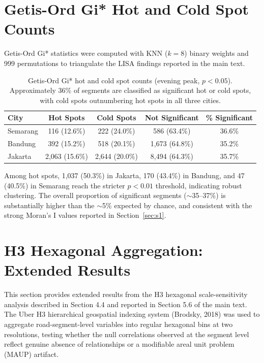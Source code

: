 \documentclass[preprint,12pt]{elsarticle}
\begin{document}
\section{Getis-Ord Gi* Hot and Cold Spot Counts}
\label{sec:s3}

Getis-Ord Gi* statistics were computed with KNN ($k{=}8$) binary weights and 999 permutations to triangulate the LISA findings reported in the main text.

\begin{table}[!htbp]
\centering
\caption{Getis-Ord Gi* hot and cold spot counts (evening peak, $p < 0.05$). Approximately 36\% of segments are classified as significant hot or cold spots, with cold spots outnumbering hot spots in all three cities.}
\label{tab:s3}
\begin{tabular}{lcccc}
\toprule
City & Hot Spots & Cold Spots & Not Significant & \% Significant \\
\midrule
Semarang & 116 (12.6\%) & 222 (24.0\%) & 586 (63.4\%)   & 36.6\% \\
Bandung  & 392 (15.2\%) & 518 (20.1\%) & 1,673 (64.8\%) & 35.2\% \\
Jakarta  & 2,063 (15.6\%) & 2,644 (20.0\%) & 8,494 (64.3\%) & 35.7\% \\
\bottomrule
\end{tabular}
\end{table}

Among hot spots, 1,037 (50.3\%) in Jakarta, 170 (43.4\%) in Bandung, and 47 (40.5\%) in Semarang reach the stricter $p < 0.01$ threshold, indicating robust clustering. The overall proportion of significant segments ($\sim$35--37\%) is substantially higher than the $\sim$5\% expected by chance, and consistent with the strong Moran's I values reported in Section~\ref{sec:s1}.

\section{H3 Hexagonal Aggregation: Extended Results}
\label{sec:s4}

This section provides extended results from the H3 hexagonal scale-sensitivity analysis described in Section 4.4 and reported in Section 5.6 of the main text. The Uber H3 hierarchical geospatial indexing system (Brodsky, 2018) was used to aggregate road-segment-level variables into regular hexagonal bins at two resolutions, testing whether the null correlations observed at the segment level reflect genuine absence of relationships or a modifiable areal unit problem (MAUP) artifact.
\end{document}
